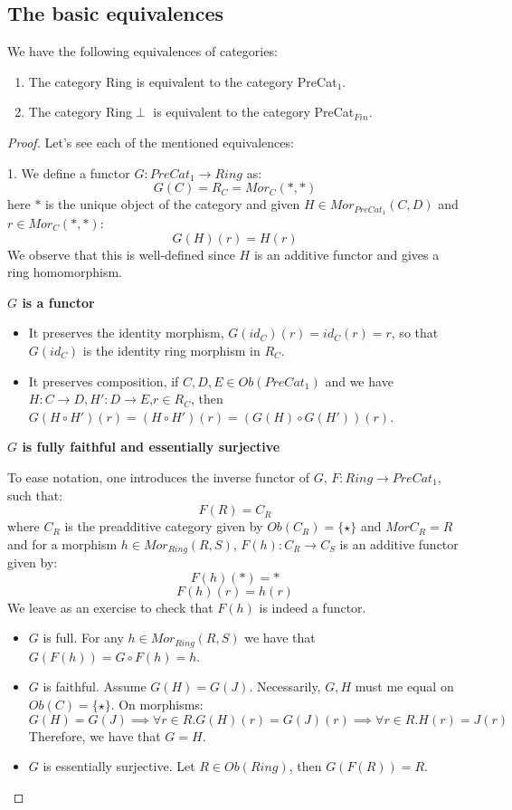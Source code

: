 \subsection{The basic equivalences \cite{poon}}

\begin{proposition}
We have the following equivalences of categories:

\begin{enumerate}
\item The category Ring is equivalent to the category PreCat$_1$.
\item The category Ring$\perp$ is equivalent to the category PreCat$_{Fin}$.
\end{enumerate}
\end{proposition}
\begin{proof}
Let's see each of the mentioned equivalences:

1. We define a functor $G:PreCat_1 \to Ring$ as: $$G(C) = R_C = Mor_C(*,*)$$ here $*$ is the unique object of the category and given $H \in  Mor_{PreCat_1}(C,D)$ and $r \in Mor_{C}(*,*)$: $$G(H)(r) = H(r)$$ We observe that this is well-defined since $H$ is an additive functor and gives a ring homomorphism.

\textbf{$G$ is a functor}

\begin{itemize}
\item It preserves the identity morphism, $G(id_C)(r) = id_C(r) = r$, so that $G(id_C)$ is the identity ring morphism in $R_C$.
\item It preserves composition, if $C,D,E \in Ob(PreCat_1)$ and we have $H:C \to D,H':D \to E$,$r \in R_C$, then $G(H \circ H')(r) = (H \circ H')(r) = (G(H) \circ G(H'))(r)$.
\end{itemize}  

\textbf{$G$ is fully faithful and essentially surjective}

To ease notation, one introduces the inverse functor of $G$, $F:Ring \to PreCat_1$, such that: $$F(R) = C_R$$ where $C_R$ is the preadditive category given by $Ob(C_R) = \{\star\}$ and $Mor C_R = R$ and for a morphism $h \in Mor_{Ring}(R,S)$, $F(h):C_R \to C_S$ is an additive functor given by: $$F(h)(*) = *$$ $$F(h)(r) = h(r)$$ We leave as an exercise to check that $F(h)$ is indeed a functor. 

\begin{itemize}
\item $G$ is full. For any $h \in Mor_{Ring}(R,S)$ we have that $G(F(h)) = G \circ F(h) = h$. 
\item $G$ is faithful. Assume $G(H) = G(J)$. Necessarily, $G,H$ must me equal on $Ob(C) = \{\star\}$. On morphisms: $$G(H) = G(J) \implies \forall r \in R. G(H)(r) = G(J)(r) \implies \forall r \in R. H(r) = J(r)$$ Therefore, we have that $G = H$.
\item $G$ is essentially surjective.  Let $R \in Ob(Ring)$, then $G(F(R)) = R$.
\end{itemize}  


\end{proof}
